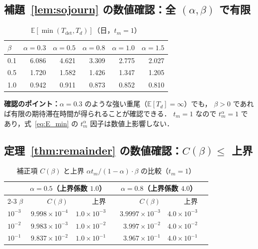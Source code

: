 \documentclass[12pt,a4paper]{article}
\theoremstyle{plain}
\theoremstyle{definition}
\theoremstyle{remark}
\newcommand{\E}{\mathbb{E}}
\newcommand{\Tdet}{T_{\mathrm{det}}}
\begin{document}
\subsection{補題~\ref{lem:sojourn} の数値確認：全 $(\alpha,\beta)$ で有限}

\begin{table}[H]
\centering
\caption{$\E[\min(\Tdet,T_d)]$（日，$t_m=1$）}
\label{tab:sojourn}
\begin{tabular}{@{}lrrrrr@{}}
\toprule
$\beta$ & $\alpha=0.3$ & $\alpha=0.5$ & $\alpha=0.8$ & $\alpha=1.0$ & $\alpha=1.5$ \\
\midrule
0.1 & 6.086 & 4.621 & 3.309 & 2.775 & 2.027 \\
0.5 & 1.720 & 1.582 & 1.426 & 1.347 & 1.205 \\
1.0 & 0.942 & 0.911 & 0.873 & 0.852 & 0.810 \\
\bottomrule
\end{tabular}
\end{table}

\noindent
\textbf{確認のポイント：}$\alpha=0.3$ のような強い重尾（$\E[T_d]=\infty$）でも，
$\beta>0$ であれば有限の期待滞在時間が得られることが確認できる．
$t_m=1$ なので $t_m^\alpha=1$ であり，式~\eqref{eq:E_min} の $t_m^\alpha$ 因子は数値上影響しない．

\subsection{定理~\ref{thm:remainder} の数値確認：$C(\beta)\le$ 上界}

\begin{table}[H]
\centering
\caption{補正項 $C(\beta)$ と上界 $\alpha t_m/(1-\alpha)\cdot\beta$ の比較（$t_m=1$）}
\label{tab:remainder}
\begin{tabular}{@{}lrrlrrl@{}}
\toprule
& \multicolumn{2}{c}{$\alpha=0.5$（上界係数 $1.0$）} &&
\multicolumn{2}{c}{$\alpha=0.8$（上界係数 $4.0$）}\\
\cmidrule{2-3}\cmidrule{5-6}
$\beta$ & $C(\beta)$ & 上界 && $C(\beta)$ & 上界 \\
\midrule
$10^{-3}$ & $9.998\times10^{-4}$ & $1.0\times10^{-3}$ &&
$3.9997\times10^{-3}$ & $4.0\times10^{-3}$ \\
$10^{-2}$ & $9.983\times10^{-3}$ & $1.0\times10^{-2}$ &&
$3.997\times10^{-2}$ & $4.0\times10^{-2}$ \\
$10^{-1}$ & $9.837\times10^{-2}$ & $1.0\times10^{-1}$ &&
$3.967\times10^{-1}$ & $4.0\times10^{-1}$ \\
\bottomrule
\end{tabular}
\end{table}
\end{document}
